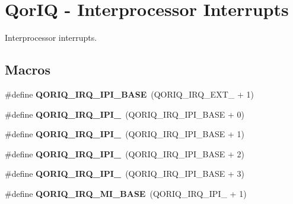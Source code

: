 \hypertarget{group__QoriqInterruptIPI}{}\section{Qor\+IQ -\/ Interprocessor Interrupts}
\label{group__QoriqInterruptIPI}


Interprocessor interrupts.  


\subsection*{Macros}
\begin{DoxyCompactItemize}
\item 
\mbox{\label{group__QoriqInterruptIPI_ga3190fa6ee095b6ee4e27644ae558b358}} 
\#define {\bfseries Q\+O\+R\+I\+Q\+\_\+\+I\+R\+Q\+\_\+\+I\+P\+I\+\_\+\+B\+A\+SE}~(Q\+O\+R\+I\+Q\+\_\+\+I\+R\+Q\+\_\+\+E\+X\+T\+\_ + 1)
\item 
\mbox{\label{group__QoriqInterruptIPI_ga6740d0be0e2bfee28ffe07cf54df2de0}} 
\#define {\bfseries Q\+O\+R\+I\+Q\+\_\+\+I\+R\+Q\+\_\+\+I\+P\+I\+\_}~(Q\+O\+R\+I\+Q\+\_\+\+I\+R\+Q\+\_\+\+I\+P\+I\+\_\+\+B\+A\+SE + 0)
\item 
\mbox{\label{group__QoriqInterruptIPI_gac45c85af50dbf2e9f5c4693fd731c500}} 
\#define {\bfseries Q\+O\+R\+I\+Q\+\_\+\+I\+R\+Q\+\_\+\+I\+P\+I\+\_}~(Q\+O\+R\+I\+Q\+\_\+\+I\+R\+Q\+\_\+\+I\+P\+I\+\_\+\+B\+A\+SE + 1)
\item 
\mbox{\label{group__QoriqInterruptIPI_ga92d0a749dad175463a9d3d4418d865b6}} 
\#define {\bfseries Q\+O\+R\+I\+Q\+\_\+\+I\+R\+Q\+\_\+\+I\+P\+I\+\_}~(Q\+O\+R\+I\+Q\+\_\+\+I\+R\+Q\+\_\+\+I\+P\+I\+\_\+\+B\+A\+SE + 2)
\item 
\mbox{\label{group__QoriqInterruptIPI_ga054d5e799799c73c695ec20da1bb7149}} 
\#define {\bfseries Q\+O\+R\+I\+Q\+\_\+\+I\+R\+Q\+\_\+\+I\+P\+I\+\_}~(Q\+O\+R\+I\+Q\+\_\+\+I\+R\+Q\+\_\+\+I\+P\+I\+\_\+\+B\+A\+SE + 3)
\item 
\mbox{\label{group__QoriqInterruptIPI_ga83c8d1f4c31d05b15ec299eb2abaa86c}} 
\#define {\bfseries Q\+O\+R\+I\+Q\+\_\+\+I\+R\+Q\+\_\+\+M\+I\+\_\+\+B\+A\+SE}~(Q\+O\+R\+I\+Q\+\_\+\+I\+R\+Q\+\_\+\+I\+P\+I\+\_ + 1)

\end{DoxyCompactItemize}
